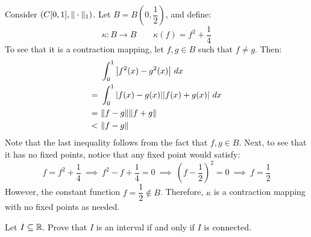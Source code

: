 \documentclass{article}
\begin{document}
\begin{soln}
    Consider $ (C[0,1], \|\cdot\|_{1}) $.
    Let $ B = B \left( 0, \dfrac{1}{2} \right) $, and define:
    \begin{equation*}
        \kappa: B \rightarrow B \qquad \kappa(f) = f^{2} + \frac{1}{4}
    \end{equation*}
    To see that it is a contraction mapping, let $ f, g \in B $ such that $ f \neq g $. Then:
    \begin{align*}
        & \int_{0}^{1} \abs{f^{2}(x) - g^{2}(x)} \ dx \\
        = \ & \int_{0}^{1} \abs{f(x) - g(x)} \abs{f(x) + g(x)} \ dx \\
        = \ & \|f - g\| \|f + g\| \\
        < \ & \|f - g\|
    \end{align*}
    Note that the last inequality follows from the fact that $ f, g \in B $. \vsp
    Next, to see that it has no fixed points, notice that any fixed point would satisfy:
    \begin{equation*}
        f = f^{2} + \frac{1}{4}
        \ \implies \ f^{2} - f + \frac{1}{4} = 0
        \ \implies \ \left( f - \frac{1}{2} \right)^{2} = 0
        \ \implies \ f = \frac{1}{2}
    \end{equation*}
    However, the constant function $ f = \dfrac{1}{2} \notin B $.
    Therefore, $ \kappa $ is a contraction mapping with no fixed points as needed.
\end{soln}

\newpage
{}

\begin{qu}
    Let $ I \subseteq \mathbb{R} $.
    Prove that $ I $ is an interval if and only if $ I $ is connected.
\end{qu}
\end{document}
